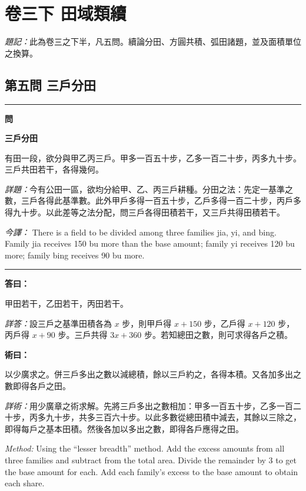 \documentclass[11pt,a4paper]{article}
\newenvironment{problem}[1][]{%
  \medskip\noindent\rule{\textwidth}{0.4pt}%
  \par\noindent\textbf{\color{sectioncolor}#1}\par\nopagebreak%
  \smallskip%
}{%
  \par\noindent\rule{\textwidth}{0.4pt}\medskip%
}
\newenvironment{answer}{%
  \medskip\noindent{\color{answercolor}\rule{0.5\textwidth}{0.5pt}}%
  \par\color{answercolor}%
}{%
  \par\medskip%
}
\newenvironment{method}{%
  \medskip\noindent{\color{methodcolor}\rule{0.5\textwidth}{0.5pt}}%
  \par\color{methodcolor}%
}{%
  \par\medskip%
}
\begin{document}
\section{卷三下 田域類續}
\label{sec:juan3xia}

\noindent\textit{題記：}此為卷三之下半，凡五問。續論分田、方圓共積、弧田諸題，並及面積單位之換算。

\subsection*{第五問 三戶分田}

\begin{problem}[\textbf{問}]
\textbf{\color{sectioncolor}三戶分田}

有田一段，欲分與甲乙丙三戶。甲多一百五十步，乙多一百二十步，丙多九十步。三戶共田若干，各得幾何。

\medskip
\textit{詳題：}今有公田一區，欲均分給甲、乙、丙三戶耕種。分田之法：先定一基準之數，三戶各得此基準數。此外甲戶多得一百五十步，乙戶多得一百二十步，丙戶多得九十步。以此差等之法分配，問三戶各得田積若干，又三戶共得田積若干。

\medskip
\textit{今譯：} There is a field to be divided among three families jia, yi, and bing. Family jia receives 150 bu more than the base amount; family yi receives 120 bu more; family bing receives 90 bu more.
\end{problem}

\begin{answer}
\textbf{答曰：}

甲田若干，乙田若干，丙田若干。

\medskip
\textit{詳答：}設三戶之基準田積各為 $x$ 步，則甲戶得 $x+150$ 步，乙戶得 $x+120$ 步，丙戶得 $x+90$ 步。三戶共得 $3x+360$ 步。若知總田之數，則可求得各戶之積。
\end{answer}

\begin{method}
\textbf{術曰：}

以少廣求之。併三戶多出之數以減總積，餘以三戶約之，各得本積。又各加多出之數即得各戶之田。

\medskip
\textit{詳術：}用少廣章之術求解。先將三戶多出之數相加：甲多一百五十步，乙多一百二十步，丙多九十步，共多三百六十步。以此多數從總田積中減去，其餘以三除之，即得每戶之基本田積。然後各加以多出之數，即得各戶應得之田。

\medskip
\textit{Method:} Using the ``lesser breadth'' method. Add the excess amounts from all three families and subtract from the total area. Divide the remainder by 3 to get the base amount for each. Add each family's excess to the base amount to obtain each share.
\end{method}
\end{document}
